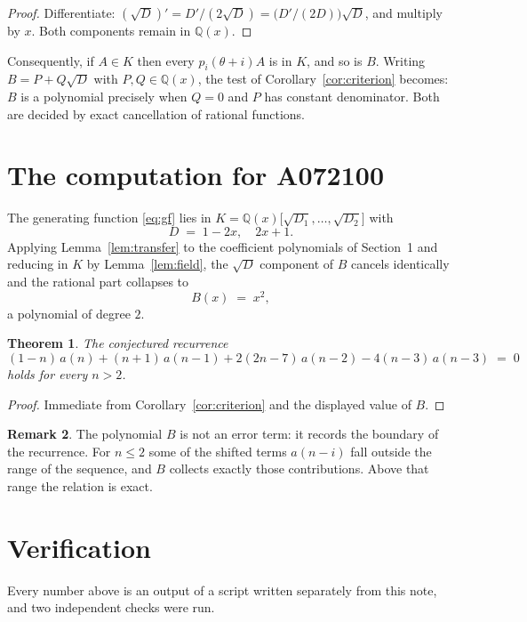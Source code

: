 \documentclass[11pt,a4paper]{article}
\theoremstyle{plain}
\newtheorem{theorem}{Theorem}
\theoremstyle{definition}
\newtheorem{remark}[theorem]{Remark}
\begin{document}
\begin{proof}
Differentiate: $(\sqrt{D})'=D'/(2\sqrt{D})=\bigl(D'/(2D)\bigr)\sqrt{D}$, and multiply by
$x$. Both components remain in $\mathbb{Q}(x)$.
\end{proof}

Consequently, if $A\in K$ then every $p_{i}(\theta+i)A$ is in $K$, and so is $B$. Writing
$B=P+Q\sqrt{D}$ with $P,Q\in\mathbb{Q}(x)$, the test of Corollary~\ref{cor:criterion}
becomes: $B$ is a polynomial precisely when $Q=0$ and $P$ has constant denominator. Both
are decided by exact cancellation of rational functions.

\section{The computation for A072100}

The generating function \eqref{eq:gf} lies in $K=\mathbb{Q}(x)\bigl[\sqrt{D_{1}},\dots,\sqrt{D_{2}}\bigr]$ with
\[
D \;=\; 1 - 2 x,\quad 2 x + 1 .
\]
Applying Lemma~\ref{lem:transfer} to the coefficient polynomials of Section~1 and reducing
in $K$ by Lemma~\ref{lem:field}, the $\sqrt{D}$ component of $B$ cancels identically and
the rational part collapses to
\[
B(x)\;=\;x^{2} ,
\]
a polynomial of degree $2$.

\begin{theorem}
The conjectured recurrence
\[
(1 - n)\,a(n) + (n + 1)\,a(n-1) + 2 \left(2 n - 7\right)\,a(n-2) -  4 \left(n - 3\right)\,a(n-3) \;=\;0
\]
holds for every $n>2$.
\end{theorem}

\begin{proof}
Immediate from Corollary~\ref{cor:criterion} and the displayed value of $B$.
\end{proof}

\begin{remark}
The polynomial $B$ is not an error term: it records the boundary of the recurrence. For
$n\le2$ some of the shifted terms $a(n-i)$ fall outside the range of the sequence,
and $B$ collects exactly those contributions. Above that range the relation is exact.
\end{remark}

\section{Verification}

Every number above is an output of a script written separately from this note, and two
independent checks were run.
\end{document}

